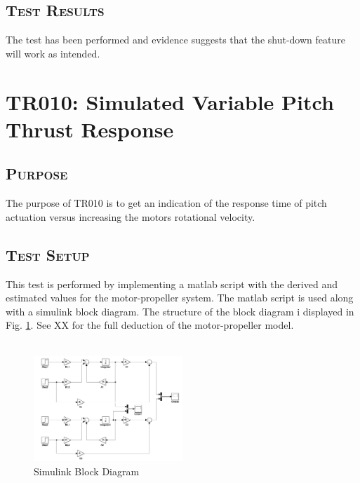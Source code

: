 \subsection*{\textsc{\medium Test Results}}
The test has been performed and evidence suggests that the shut-down feature will work as intended.

\newpage

\section{TR010: Simulated Variable Pitch Thrust Response}
         {}

\subsection*{\textsc{\medium Purpose}}
The purpose of TR010 is to get an indication of the response time of pitch actuation versus increasing the motors rotational velocity.


\subsection*{\textsc{\medium Test Setup}}
This test is performed by implementing a matlab script with the derived and estimated values for the motor-propeller system. The matlab script is used along with a simulink block diagram. The structure of the block diagram i displayed in Fig. \ref{fig:blabla}. See XX for the full deduction of the motor-propeller model.\\
\\
\begin{figure}[H]
    \centering
    \includegraphics[width = 0.5\textwidth]{VAPIQ-PICTURES/blabla.png}
    \caption{Simulink Block Diagram}
    \label{fig:blabla}
\end{figure}

